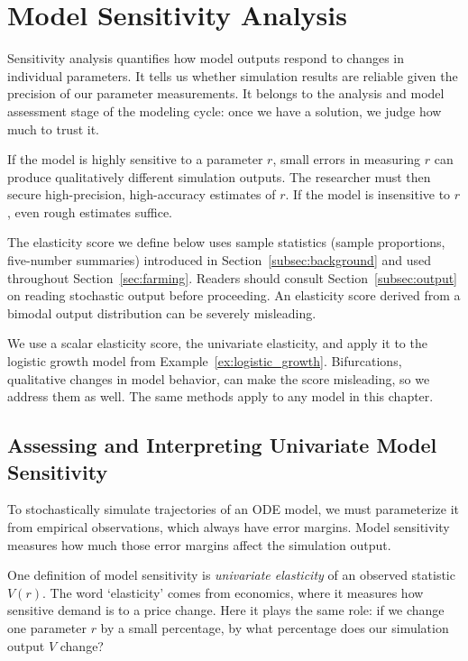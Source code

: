 \section{Model Sensitivity Analysis}\label{sec:sensitivity_analysis}


Sensitivity analysis quantifies how model outputs respond to changes in individual parameters. It tells us whether simulation results are reliable given the precision of our parameter measurements. It belongs to the analysis and model assessment stage of the modeling cycle: once we have a solution, we judge how much to trust it.

If the model is highly sensitive to a parameter $r$, small errors in measuring $r$ can produce qualitatively different simulation outputs. The researcher must then secure high-precision, high-accuracy estimates of $r$. If the model is insensitive to $r$, even rough estimates suffice.

The elasticity score we define below uses sample statistics (sample proportions, five-number summaries) introduced in Section~\ref{subsec:background} and used throughout Section~\ref{sec:farming}. Readers should consult Section~\ref{subsec:output} on reading stochastic output before proceeding. An elasticity score derived from a bimodal output distribution can be severely misleading.

We use a scalar elasticity score, the univariate elasticity, and apply it to the logistic growth model from Example~\ref{ex:logistic_growth}. Bifurcations, qualitative changes in model behavior, can make the score misleading, so we address them as well. The same methods apply to any model in this chapter.


\subsection{Assessing and Interpreting Univariate Model Sensitivity}\label{subsec:elasticity}


To stochastically simulate trajectories of an ODE model, we must parameterize it from empirical observations, which always have error margins. Model sensitivity measures how much those error margins affect the simulation output.

One definition of model sensitivity is \textit{univariate elasticity} of an observed statistic $V(r)$. The word `elasticity' comes from economics, where it measures how sensitive demand is to a price change. Here it plays the same role: if we change one parameter $r$ by a small percentage, by what percentage does our simulation output $V$ change?

